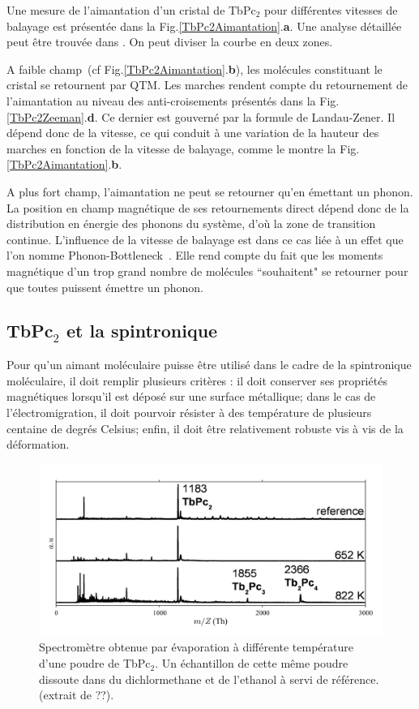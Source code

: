 Une mesure de l'aimantation d'un cristal de TbPc$_2$ pour différentes vitesses de balayage est présentée dans la Fig.\ref{TbPc2Aimantation}.\textbf{a}. Une analyse détaillée peut \^etre trouvée dans \cite{Ishikawa2005}. On peut diviser la courbe en deux zones. 

A faible champ~(cf Fig.\ref{TbPc2Aimantation}.\textbf{b}), les molécules constituant le cristal se retournent par QTM. Les marches rendent compte du retournement de l'aimantation au niveau des anti-croisements présentés dans la Fig.\ref{TbPc2Zeeman}.\textbf{d}. Ce dernier est gouverné par la formule de Landau-Zener. Il dépend donc de la vitesse, ce qui conduit à une variation de la hauteur des marches en fonction de la vitesse de balayage, comme le montre la Fig.\ref{TbPc2Aimantation}.\textbf{b}. 

A plus fort champ, l'aimantation ne peut se retourner qu'en émettant un phonon. La position en champ magnétique de ses retournements direct dépend donc de la distribution en énergie des phonons du système, d'où la zone de transition continue. L'influence de la vitesse de balayage est dans ce cas liée à un effet que l'on nomme Phonon-Bottleneck~\cite{VanVleck1941}. Elle rend compte du fait que les moments magnétique d'un trop grand nombre de molécules ``souhaitent" se retourner pour que toutes puissent émettre un phonon.

\subsection{TbPc$_2$ et la spintronique}
Pour qu'un aimant moléculaire puisse être utilisé dans le cadre de la spintronique moléculaire, il doit remplir plusieurs critères : il doit conserver ses propriétés magnétiques lorsqu'il est déposé sur une surface métallique; dans le cas de l'électromigration, il doit pourvoir résister à des température de plusieurs centaine de degrés Celsius; enfin, il doit être relativement robuste vis à vis de la déformation.

\begin{figure}
\centering \includegraphics[scale=0.45]{Resultats/TbPcResTemp/TbPcResTemp.pdf} 
\caption{Spectromètre obtenue par évaporation à différente température d'une poudre de TbPc$_2$. Un échantillon de cette même poudre dissoute dans du dichlormethane et de l'ethanol à servi de référence. (extrait de ??).}
\label{SpectMass}
\end{figure}

